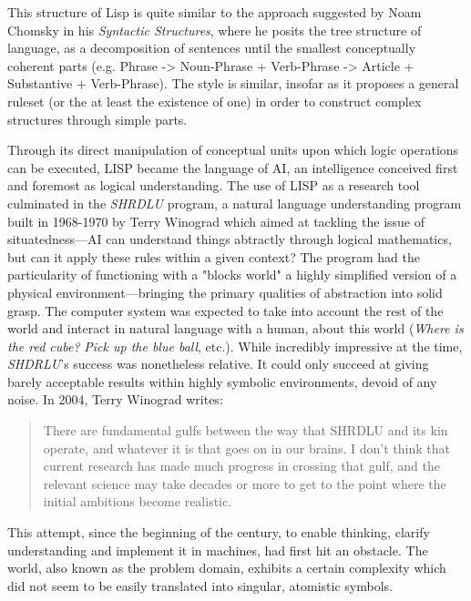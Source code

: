This structure of Lisp is quite similar to the approach suggested by Noam Chomsky in his \emph{Syntactic Structures}, where he posits the tree structure of language, as a decomposition of sentences until the smallest conceptually coherent parts (e.g. Phrase -> Noun-Phrase + Verb-Phrase -> Article + Substantive + Verb-Phrase). The style is similar, insofar as it proposes a general ruleset (or the at least the existence of one) in order to construct complex structures through simple parts.

Through its direct manipulation of conceptual units upon which logic operations can be executed, LISP became the language of AI, an intelligence conceived first and foremost as logical understanding. The use of LISP as a research tool culminated in the \emph{SHRDLU} program, a natural language understanding program built in 1968-1970 by Terry Winograd which aimed at tackling the issue of situatedness—AI can understand things abtractly through logical mathematics, but can it apply these rules within a given context? The program had the particularity of functioning with a "blocks world" a highly simplified version of a physical environment—bringing the primary qualities of abstraction into solid grasp. The computer system was expected to take into account the rest of the world and interact in natural language with a human, about this world (\emph{Where is the red cube?} \emph{Pick up the blue ball}, etc.). While incredibly impressive at the time, \emph{SHDRLU}'s success was nonetheless relative. It could only succeed at giving barely acceptable results within highly symbolic environments, devoid of any noise. In 2004, Terry Winograd writes:

\begin{quote}
    There are fundamental gulfs between the way that SHRDLU and its kin operate, and whatever it is that goes on in our brains. I don't think that current research has made much progress in crossing that gulf, and the relevant science may take decades or more to get to the point where the initial ambitions become realistic.  \citep{nilsson_quest_2009}
\end{quote}

This attempt, since the beginning of the century, to enable thinking, clarify understanding and implement it in machines, had first hit an obstacle. The world, also known as the problem domain, exhibits a certain complexity which did not seem to be easily translated into singular, atomistic symbols.

